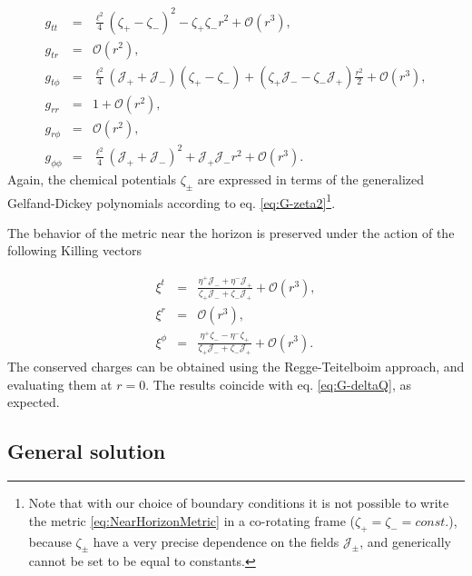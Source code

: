 \documentclass[letterpaper,11pt,oneside]{book}
\begin{document}
\begin{eqnarray}
	g_{tt} & = & \frac{\ell^{2}}{4}\left(\zeta_{+}-\zeta_{-}\right)^{2}-\zeta_{+}\zeta_{-}r^{2}+\mathcal{O}\left(r^{3}\right),\nonumber \\
	g_{tr} & = & \mathcal{O}\left(r^{2}\right),\nonumber \\
	g_{t\phi} & = & \frac{\ell^{2}}{4}\left(\mathcal{J}_{+}+\mathcal{J}_{-}\right)\left(\zeta_{+}-\zeta_{-}\right)+\left(\zeta_{+}\mathcal{J}_{-}-\zeta_{-}\mathcal{J}_{+}\right)\frac{r^{2}}{2}+\mathcal{O}\left(r^{3}\right),\label{eq:NearHorizonMetric}\\
	g_{rr} & = & 1+\mathcal{O}\left(r^{2}\right),\nonumber \\
	g_{r\phi} & = & \mathcal{O}\left(r^{2}\right),\nonumber \\
	g_{\phi\phi} & = & \frac{\ell^{2}}{4}\left(\mathcal{J}_{+}+\mathcal{J}_{-}\right)^{2}+\mathcal{J}_{+}\mathcal{J}_{-}r^{2}+\mathcal{O}\left(r^{3}\right).\nonumber 
\end{eqnarray}
Again, the chemical potentials $\zeta_{\pm}$ are expressed in terms
of the generalized Gelfand-Dickey polynomials according to eq. \eqref{eq:G-zeta2}\footnote{Note that with our choice of boundary conditions it is not possible
	to write the metric \eqref{eq:NearHorizonMetric} in a co-rotating
	frame ($\zeta_{+}=\zeta_{-}=const.$), because $\zeta_{\pm}$ have
	a very precise dependence on the fields $\mathcal{J_{\pm}}$, and
	generically cannot be set to be equal to constants.}.

The behavior of the metric near the horizon is preserved under the
action of the following Killing vectors

\begin{eqnarray}
	\xi^{t} & = & \frac{\eta^{+}\mathcal{J}_{-}+\eta^{-}\mathcal{J}_{+}}{\zeta_{+}\mathcal{J}_{-}+\zeta_{-}\mathcal{J}_{+}}+\mathcal{O}\left(r^{3}\right),\nonumber \\
	\xi^{r} & = & \mathcal{O}\left(r^{3}\right),\\
	\xi^{\phi} & = & \frac{\eta^{+}\zeta_{-}-\eta^{-}\zeta_{+}}{\zeta_{+}\mathcal{J}_{-}+\zeta_{-}\mathcal{J}_{+}}+\mathcal{O}\left(r^{3}\right).\nonumber 
\end{eqnarray}
The conserved charges can be obtained using the Regge-Teitelboim approach,
and evaluating them at $r=0$. The results coincide with eq. \eqref{eq:G-deltaQ},
as expected.

\subsection{General solution}
\end{document}
